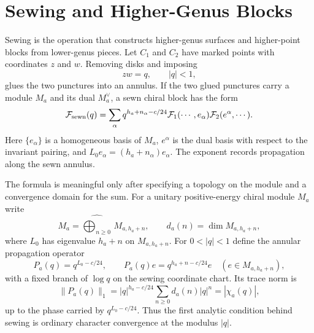 \section{Sewing and Higher-Genus Blocks}
\label{sec:voa-higher-genus-sewing}

Sewing is the operation that constructs higher-genus surfaces and higher-point
blocks from lower-genus pieces.  Let \(C_1\) and \(C_2\) have marked points
with coordinates \(z\) and \(w\).  Removing disks and imposing
\[
  zw=q,\qquad |q|<1,
\]
glues the two punctures into an annulus.  If the two glued punctures carry a
module \(M_a\) and its dual \(M_a^\vee\), a sewn chiral block has the form
\begin{equation}
  \mathcal F_{\rm sewn}(q)
  =
  \sum_{\alpha}
  q^{h_a+n_\alpha-c/24}
  \mathcal F_1(\cdots,e_\alpha)
  \mathcal F_2(e^\alpha,\cdots).
  \label{eq:chiral-block-sewing}
\end{equation}
Here \(\{e_\alpha\}\) is a homogeneous basis of \(M_a\), \(e^\alpha\) is the
dual basis with respect to the invariant pairing, and
\(L_0 e_\alpha=(h_a+n_\alpha)e_\alpha\).  The exponent records propagation
along the sewn annulus.

The formula is meaningful only after specifying a topology on the module and
a convergence domain for the sum.  For a unitary positive-energy chiral
module \(M_a\) write
\[
  M_a=\widehat{\bigoplus_{n\ge0}}\,M_{a,h_a+n},
  \qquad
  d_a(n)=\dim M_{a,h_a+n},
\]
where \(L_0\) has eigenvalue \(h_a+n\) on \(M_{a,h_a+n}\).  For
\(0<|q|<1\) define the annular propagation operator
\begin{equation}
  P_a(q)=q^{L_0-c/24},
  \qquad
  P_a(q)e=q^{h_a+n-c/24}e
  \quad(e\in M_{a,h_a+n}),
  \label{eq:annular-propagator}
\end{equation}
with a fixed branch of \(\log q\) on the sewing coordinate chart.  Its trace
norm is
\begin{equation}
  \|P_a(q)\|_1
  =
  |q|^{h_a-c/24}\sum_{n\ge0}d_a(n)|q|^n
  =
  |\chi_a(q)|,
  \label{eq:annular-propagator-trace-norm}
\end{equation}
up to the phase carried by \(q^{L_0-c/24}\).  Thus the first analytic
condition behind sewing is ordinary character convergence at the modulus
\(|q|\).

